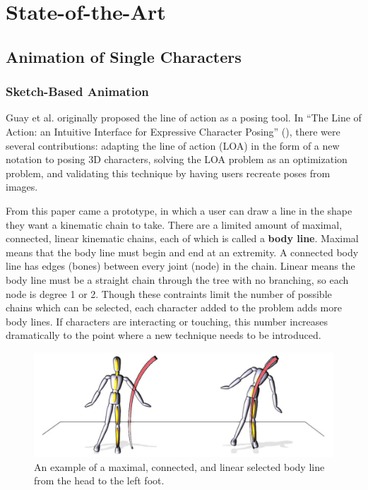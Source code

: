 \chapter{State-of-the-Art}\label{chap:sota}
\section{Animation of Single Characters}
\subsection{Sketch-Based Animation}
Guay et al. originally proposed the line of action as a posing tool. In ``The Line of Action: an Intuitive Interface for Expressive Character Posing'' (\citep{guay2013line}), there were several contributions: adapting the line of action (LOA) in the form of a new notation to posing 3D characters, solving the LOA problem as an optimization problem, and validating this technique by having users recreate poses from images. 

From this paper came a prototype, in which a user can draw a line in the shape they want a kinematic chain to take. There are a limited amount of maximal, connected, linear kinematic chains, each of which is called a \textbf{body line}. Maximal means that the body line must begin and end at an extremity. A connected body line has edges (bones) between every joint (node) in the chain. Linear means the body line must be a straight chain through the tree with no branching, so each node is degree 1 or 2. Though these contraints limit the number of possible chains which can be selected, each character added to the problem adds more body lines. If characters are interacting or touching, this number increases dramatically to the point where a new technique needs to be introduced.

\begin{figure}[!h]
\centering
\includegraphics[scale=0.4]{img/bodyline}
\caption{An example of a maximal, connected, and linear selected body line from the head to the left foot.}
\end{figure}

